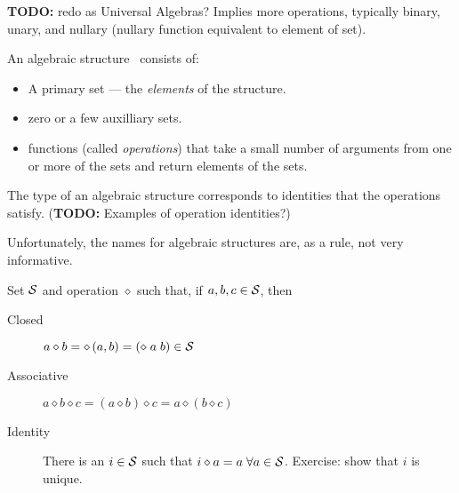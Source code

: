 \setcounter{currentlevel}{\value{baseSectionLevel}}
\label{sec:Algebraic-structures}

\textbf{TODO:} redo as Universal Algebras?
Implies more operations, typically binary, unary, and nullary
(nullary function equivalent to element of set).

An algebraic 
structure~\cite{
wiki:Algebraic-structure,
wiki:Mathematical-structure,
wiki:Outline-of-algebraic-structures,
BWilliams:Algebraic-structure-and-protocols,
BWilliams:Algebra-of-predicates-and-sorting-functions,
BWilliams:Semirings-and-predicates}
consists of:
\begin{itemize}
  \item A primary set --- the \textit{elements} of the structure.
  \item zero or a few auxilliary sets.
  \item functions (called \textit{operations})
that take a small number of arguments from one or more of the sets
and return elements of the sets.
\end{itemize}

The type of an algebraic structure corresponds to identities
that the operations satisfy.
(\textbf{TODO:} Examples of operation identities?)

Unfortunately, the names for algebraic structures 
are, as a rule, not very informative.

\label{sec:Monoid}

Set $\mathcal{S}$ and operation $\diamond$ such that,
if $a, b, c \in \mathcal{S}$, then
\begin{description}
\item[Closed] $a \diamond b = \diamond \left( a, b \right) 
= \left( \diamond \; a \; b \right) \in \mathcal{S}$
\item[Associative] $a \diamond b \diamond c =
 \left( a \diamond b \right) \diamond c =  
 a \diamond \left( b \diamond c \right) $
 \item[Identity] There is an $i \in \mathcal{S}$ such that 
 $i \diamond a = a \; \forall a \in \mathcal{S}$.
 Exercise: show that $i$ is unique.
 \end{description}

